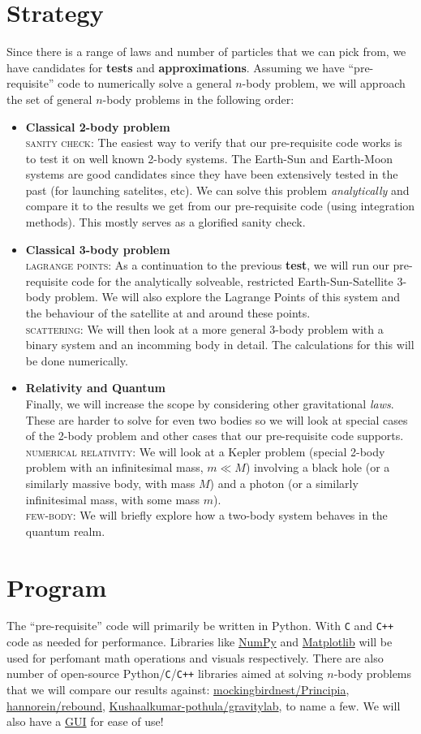 \documentclass[hidelinks, 11pt, dvipsnames]{article}
\newcommand{\psubsection}[1]{
    \noindent 
    \section*{#1}
}
\begin{document}
\psubsection{Strategy}
Since there is a range of laws and number of particles that we can pick from, we have candidates for \textbf{tests} and \textbf{approximations}. Assuming we have ``pre-requisite'' code to numerically solve a general $n$-body problem, we will approach the set of general $n$-body problems in the following order:
\begin{itemize}
    \item \textbf{Classical 2-body problem} \\ 
    \textsc{sanity check}: The easiest way to verify that our pre-requisite code works is to test it on well known 2-body systems. The Earth-Sun and Earth-Moon systems are good candidates since they have been extensively tested in the past (for launching satelites, etc). We can solve this problem \emph{analytically} and compare it to the results we get from our pre-requisite code (using integration methods). This mostly serves as a glorified sanity check.
    \item \textbf{Classical 3-body problem} \\ 
    \textsc{lagrange points}: As a continuation to the previous \textbf{test}, we will run our pre-requisite code for the analytically solveable, restricted Earth-Sun-Satellite 3-body problem. We will also explore the Lagrange Points of this system and the behaviour of the satellite at and around these points. \\
    \textsc{scattering}: We will then look at a more general 3-body problem with a binary system and an incomming body in detail. The calculations for this will be done numerically.
    \item \textbf{Relativity and Quantum} \\
    Finally, we will increase the scope by considering other gravitational \emph{laws}. These are harder to solve for even two bodies so we will look at special cases of the 2-body problem and other cases that our pre-requisite code supports. \\
    \textsc{numerical relativity}: We will look at a Kepler problem (special 2-body problem with an infinitesimal mass, $m \ll M$) involving a black hole (or a similarly massive body, with mass $M$) and a photon (or a similarly infinitesimal mass, with some mass $m$). \\
    \textsc{few-body}: We will briefly explore how a two-body system behaves in the quantum realm. 
\end{itemize}

\psubsection{Program}
The ``pre-requisite'' code will primarily be written in Python. With \texttt{C} and \texttt{C++} code as needed for performance. Libraries like \href{https://numpy.org/}{NumPy} and \href{https://matplotlib.org/}{Matplotlib} will be used for perfomant math operations and visuals respectively. There are also number of open-source Python/\texttt{C}/\texttt{C++} libraries aimed at solving $n$-body problems that we will compare our results against: \href{https://github.com/mockingbirdnest/Principia}{mockingbirdnest/Principia}, \href{https://github.com/hannorein/rebound}{hannorein/rebound}, \href{https://github.com/Kushaalkumar-pothula/gravitylab}{Kushaalkumar-pothula/gravitylab}, to name a few. We will also have a \href{https://www.qt.io/qt-for-python}{GUI} for ease of use!
\end{document}

